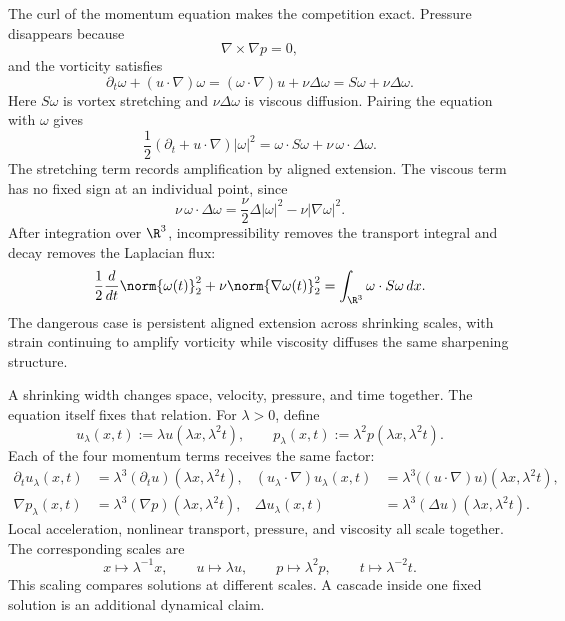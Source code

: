 The curl of the momentum equation makes the competition exact.
Pressure disappears because
\[
  \nabla\times\nabla p=0,
\]
and the vorticity satisfies
\[
  \partial_t\omega+(u\cdot\nabla)\omega
  =
  (\omega\cdot\nabla)u+\nu\Delta\omega
  =
  S\omega+\nu\Delta\omega.
\]
Here \(S\omega\) is vortex stretching and \(\nu\Delta\omega\) is viscous diffusion.
Pairing the equation with \(\omega\) gives
\[
  \frac12(\partial_t+u\cdot\nabla)|\omega|^2
  =
  \omega\cdot S\omega
  +
  \nu\,\omega\cdot\Delta\omega.
\]
The stretching term records amplification by aligned extension.
The viscous term has no fixed sign at an individual point, since
\[
  \nu\,\omega\cdot\Delta\omega
  =
  \frac{\nu}{2}\Delta|\omega|^2
  -
  \nu|\nabla\omega|^2.
\]
After integration over \(\R^3\), incompressibility removes the transport integral and decay removes the Laplacian flux:
\[
  \frac12\frac{d}{dt}\norm{\omega(t)}_2^2
  +
  \nu\norm{\nabla\omega(t)}_2^2
  =
  \int_{\R^3}\omega\cdot S\omega\,dx.
\]
The dangerous case is persistent aligned extension across shrinking scales, with strain continuing to amplify vorticity while viscosity diffuses the same sharpening structure.


A shrinking width changes space, velocity, pressure, and time together.
The equation itself fixes that relation.
For \(\lambda>0\), define
\[
  u_\lambda(x,t)
  :=
  \lambda u(\lambda x,\lambda^2t),
  \qquad
  p_\lambda(x,t)
  :=
  \lambda^2p(\lambda x,\lambda^2t).
\]
Each of the four momentum terms receives the same factor:
\[
\begin{aligned}
  \partial_t u_\lambda(x,t)
  &=
  \lambda^3(\partial_t u)(\lambda x,\lambda^2t),
  &
  (u_\lambda\cdot\nabla)u_\lambda(x,t)
  &=
  \lambda^3\bigl((u\cdot\nabla)u\bigr)(\lambda x,\lambda^2t),
  \\
  \nabla p_\lambda(x,t)
  &=
  \lambda^3(\nabla p)(\lambda x,\lambda^2t),
  &
  \Delta u_\lambda(x,t)
  &=
  \lambda^3(\Delta u)(\lambda x,\lambda^2t).
\end{aligned}
\]
Local acceleration, nonlinear transport, pressure, and viscosity all scale together.
The corresponding scales are
\[
  x\mapsto\lambda^{-1}x,
  \qquad
  u\mapsto\lambda u,
  \qquad
  p\mapsto\lambda^2p,
  \qquad
  t\mapsto\lambda^{-2}t.
\]
This scaling compares solutions at different scales.
A cascade inside one fixed solution is an additional dynamical claim.


